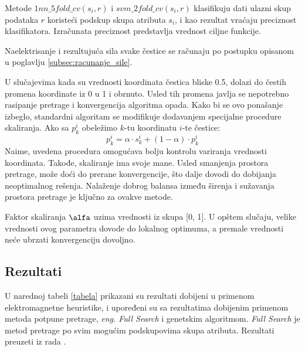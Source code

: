 \documentclass[a4paper]{article}
\begin{document}
Metode $1nn\_5fold\_cv(s_i, r)$ i $svm\_2fold\_cv(s_i, r)$ klasifikuju dati ulazni skup podataka $r$ koristeći podskup skupa atributa $s_i$, i kao rezultat vraćaju preciznost klasifikatora. Izračunata preciznost predstavlja vrednost ciljne funkcije.

Naelektrisanje i rezultujuća sila svake čestice se računaju po postupku opisanom u poglavlju \ref{subsec:racunanje_sile}.

U slučajevima kada su vrednosti koordinata čestica bliske 0.5, dolazi do čestih promena koordinate iz 0 u 1 i obrnuto. Usled tih promena javlja se nepotrebno rasipanje pretrage i konvergencija algoritma opada.
Kako bi se ovo ponašanje izbeglo, standardni algoritam se modifikuje dodavanjem specijalne procedure skaliranja. Ako sa $p_k^i$ obeležimo $k$-tu koordinatu $i$-te čestice:
\begin{equation}
\label{eq:skala}
    p_k^i = \alpha \cdot s_k^i + (1 - \alpha) \cdot p_k^i
\end{equation}
Naime, uvedena procedura omogućava bolju kontrolu variranja vrednosti koordinata. Takođe, skaliranje ima svoje mane. Usled smanjenja prostora pretrage, može doći do prerane konvergencije, što dalje dovodi do dobijanja neoptimalnog rešenja. Nalaženje dobrog balansa između širenja i sužavanja prostora pretrage je ključno za ovakve metode.

Faktor skaliranja $\alfa$ uzima vrednosti iz skupa [0, 1]. U opštem slučaju, velike vrednosti ovog parametra dovode do lokalnog optimuma, a premale vrednosti neće ubrzati konvergenciju dovoljno. 

\subsection{Rezultati}
\label{sec:rezultati}

U narednoj tabeli \ref{tabela} prikazani su rezultati dobijeni u primenom elektromagnetne heuristike, i upoređeni su sa rezultatima dobijenim primenom metoda potpune pretrage, \textit{eng. Full Search} i genetskim algoritmom. \textit{Full Search} je metod pretrage po svim mogućim podskupovima skupa atributa. Rezultati preuzeti iz rada \cite{kartelj}.
\end{document}
